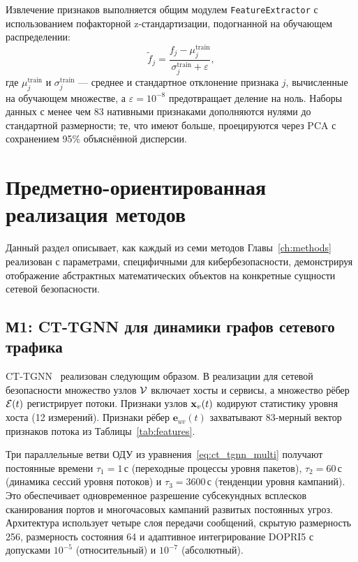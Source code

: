 Извлечение признаков выполняется общим модулем \texttt{FeatureExtractor} с использованием пофакторной z-стандартизации, подогнанной на обучающем распределении:
\begin{equation}
\tilde{f}_j = \frac{f_j - \mu_j^{\mathrm{train}}}{\sigma_j^{\mathrm{train}} + \varepsilon},
\label{eq:zscore}
\end{equation}
где $\mu_j^{\mathrm{train}}$ и $\sigma_j^{\mathrm{train}}$ --- среднее и стандартное отклонение признака $j$, вычисленные на обучающем множестве, а $\varepsilon=10^{-8}$ предотвращает деление на ноль. Наборы данных с менее чем 83 нативными признаками дополняются нулями до стандартной размерности; те, что имеют больше, проецируются через PCA с сохранением 95\% объяснённой дисперсии.


\section{Предметно-ориентированная реализация методов}
\label{sec:method_instantiation}

Данный раздел описывает, как каждый из семи методов Главы~\ref{ch:methods} реализован с параметрами, специфичными для кибербезопасности, демонстрируя отображение абстрактных математических объектов на конкретные сущности сетевой безопасности.


\subsection{М1: CT-TGNN для динамики графов сетевого трафика}

CT-TGNN~\cite{Anaedevha2025cais} реализован следующим образом. В реализации для сетевой безопасности множество узлов $\mathcal{V}$ включает хосты и сервисы, а множество рёбер $\mathcal{E}(t)$ регистрирует потоки. Признаки узлов $\mathbf{x}_v(t)$ кодируют статистику уровня хоста (12 измерений). Признаки рёбер $\mathbf{e}_{uv}(t)$ захватывают 83-мерный вектор признаков потока из Таблицы~\ref{tab:features}.

Три параллельные ветви ОДУ из уравнения~\eqref{eq:ct_tgnn_multi} получают постоянные времени $\tau_1=1$\,с (переходные процессы уровня пакетов), $\tau_2=60$\,с (динамика сессий уровня потоков) и $\tau_3=3600$\,с (тенденции уровня кампаний). Это обеспечивает одновременное разрешение субсекундных всплесков сканирования портов и многочасовых кампаний развитых постоянных угроз. Архитектура использует четыре слоя передачи сообщений, скрытую размерность 256, размерность состояния 64 и адаптивное интегрирование DOPRI5 с допусками $10^{-5}$ (относительный) и $10^{-7}$ (абсолютный).

